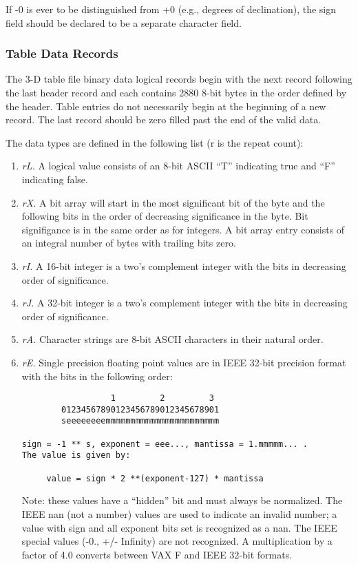 If -0 is ever to be distinguished from +0 (e.g.,
degrees of declination), the sign field should be declared to be a
separate character field.

\subsubsection{Table Data Records }
The 3-D table file binary data logical records begin with the next
record following the last header record and each contains 2880 8-bit
bytes in the order defined by the header.  Table entries do not
necessarily begin at the beginning of a new record.  The last record
should be zero filled past the end of the valid data.

The data types are defined in the following list (r is the repeat
count):
\begin{enumerate} %
\item {\it rL.} A logical value consists of an 8-bit ASCII ``T''
indicating true and ``F'' indicating false.
\item {\it rX.} A bit array will start in the most significant bit of the byte
and the following bits in the order of decreasing significance in the
byte.  Bit signifigance is in the same order as for integers.  A bit
array entry consists of an integral number of bytes with trailing bits
zero.
\item {\it rI.} A 16-bit integer is a two's complement integer with the bits
in decreasing order of significance.
\item {\it rJ.} A 32-bit integer is a two's complement integer with the bits
in decreasing order of significance.
\item {\it rA.} Character strings are 8-bit ASCII characters in their natural
order.
\item {\it rE.} Single precision floating point values are in IEEE 32-bit
precision format with the bits in the following order:
\begin{verbatim}
                  1         2         3
        01234567890123456789012345678901
        seeeeeeeemmmmmmmmmmmmmmmmmmmmmmm

sign = -1 ** s, exponent = eee..., mantissa = 1.mmmmm... .
The value is given by:

     value = sign * 2 **(exponent-127) * mantissa

\end{verbatim}
Note: these values have a ``hidden'' bit and must always be
normalized.  The IEEE nan (not a number) values are used to indicate
an invalid number; a value with sign and all exponent bits set is
recognized as a nan.
The IEEE special values (-0., +/- Infinity) are not recognized.  A
multiplication by a factor of 4.0 converts between VAX F and IEEE
32-bit formats.


\end{enumerate}
